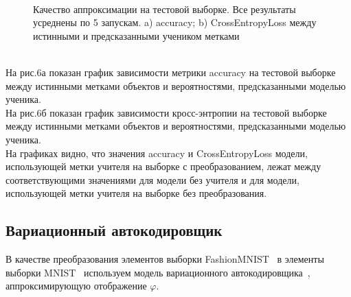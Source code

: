 \begin{figure}[h!t]\center
{}
\\
\caption{Качество аппроксимации на тестовой выборке. Все результаты усреднены по 5 запускам. a) accuracy; b) CrossEntropyLoss между истинными и предсказанными учеником метками}
\end{figure}\\
На рис.6а показан график зависимости метрики accuracy на тестовой выборке между истинными метками объектов и вероятностями, предсказанными моделью ученика.\\
На рис.6б показан график зависимости кросс-энтропии на тестовой выборке между истинными метками объектов и вероятностями, предсказанными моделью ученика.\\
На графиках видно, что значения accuracy и CrossEntropyLoss модели, использующей метки учителя на выборке с преобразованием, лежат между соответствующими значениями для модели без учителя и для модели, использующей метки учителя на выборке без преобразования.

\subsection{Вариационный автокодировщик}
В качестве преобразования элементов выборки FashionMNIST~\cite{FMNIST} в элементы выборки MNIST~\cite{MNIST} используем модель вариационного автокодировщика~\cite{VAE}, аппроксимирующую отображение $\varphi$.
